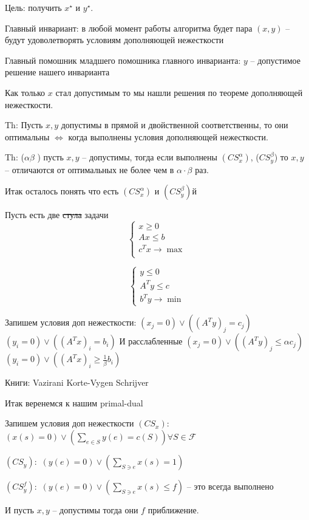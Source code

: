 Цель: получить $x^\star$ и $y^\star$.

Главный инвариант: в любой момент работы алгоритма будет пара $(x, y)$ -- будут удоволетворять условиям дополняющей нежесткости

Главный помошник младшего помошника главного инварианта: $y$ -- допустимое решение нашего инварианта

Как только $x$ стал допустимым то мы нашли решения по теореме дополняющей нежесткости.

Th: Пусть $x, y$ допустимы в прямой и двойственной соответственны, 
то они оптимальны $\Leftrightarrow$ когда выполнены условия дополняющей нежесткости.

Th: ($\alpha \beta$ ) пусть $x, y$ -- допустимы, тогда если выполнены
$(CS^\alpha_x)$, ($CS^\beta_y$) то $x, y$ -- отличаются от оптимальных не более чем в $\alpha \cdot \beta$ раз.

Итак осталось понять что есть $(CS^\alpha_x)$ и $(CS^\beta_y)$й

Пусть есть две \sout{стула} задачи
\[
	\begin{cases}
		x \geq 0\\
		A x \leq b\\
		c^Tx \to \max\\
	\end{cases}
\]

\[
	\begin{cases}
		y \leq 0\\
		A^Ty \leq c\\
		b^T y \to \min
	\end{cases}
\]

Запишем условия доп нежесткости:
$(x_j = 0) \vee \left(\left(A^T y\right)_j = c_j\right)$
$(y_i = 0) \vee \left(\left(A^T x\right)_i = b_i\right)$
И расслабленные
$(x_j = 0) \vee \left(\left(A^T y\right)_j \leq \alpha c_j\right)$
$(y_i = 0) \vee \left(\left(A^T x\right)_i \geq \frac1\beta b_i\right)$

Книги:
Vazirani
Korte-Vygen
Schrijver

Итак веренемся к нашим primal-dual

Запишем условия доп нежесткости
$(CS_x):$ $(x(s) = 0) \vee (\sum_{e \in S} y(e) = c(S)) \forall S \in \mathcal{F}$

$(CS_y):$ $(y(e) = 0) \vee (\sum_{S \ni e} x(s) = 1)$

$(CS_y^f):$ $(y(e) = 0) \vee (\sum_{S \ni e} x(s) \leq f)$ -- это всегда выполнено

И пусть $x, y$ -- допустимы тогда они $f$ приближение.

